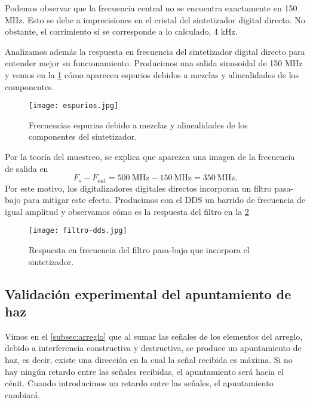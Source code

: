 \documentclass{article}
\newenvironment{standalone}{\begin{preview}}{\end{preview}}
\begin{document}
\begin{standalone}
  Podemos observar que la frecuencia central no se encuentra exactamente en 150 MHz.
  Esto se debe a imprecisiones en el cristal del sintetizador digital directo.
  No obstante, el corrimiento sí se corresponde a lo calculado, 4 kHz.

  Analizamos además la respuesta en frecuencia del sintetizador digital directo para entender mejor su funcionamiento.
  Producimos una salida sinusoidal de 150 MHz y vemos en la \cref{fig:espurios} cómo aparecen espurios debidos a mezclas y alinealidades de los componentes.

  \begin{figure}[!htbp]
    \centering
    \texttt{[image: espurios.jpg]}
    \caption{Frecuencias espurias debido a mezclas y alinealidades de los componentes del sintetizador.}
    \label{fig:espurios}
  \end{figure}

  Por la teoría del muestreo, se explica que aparezca una imagen de la frecuencia de salida en
  \begin{equation}
    F_s - F_{out} = 500 \ \si{\mega\hertz} - 150 \ \si{\mega\hertz} = 350 \ \si{\mega\hertz}. \nonumber
  \end{equation}
  Por este motivo, los digitalizadores digitales directos incorporan un filtro pasa-bajo para mitigar este efecto.
  Producimos con el DDS un barrido de frecuencia de igual amplitud y observamos cómo es la respuesta del filtro en la \cref{fig:filtro-dds}

  \begin{figure}[!htbp]
    \centering
    \texttt{[image: filtro-dds.jpg]}
    \caption{Respuesta en frecuencia del filtro pasa-bajo que incorpora el sintetizador.}
    \label{fig:filtro-dds}
  \end{figure}

  \subsection{Validación experimental del apuntamiento de haz}

  Vimos en el \cref{subsec:arreglo} que al sumar las señales de los elementos del arreglo, debido a interferencia constructiva y destructiva, se produce un apuntamiento de haz, es decir, existe una dirección en la cual la señal recibida es máxima.
  Si no hay ningún retardo entre las señales recibidas, el apuntamiento será hacia el cénit.
  Cuando introducimos un retardo entre las señales, el apuntamiento cambiará.


\end{standalone}
\end{document}
